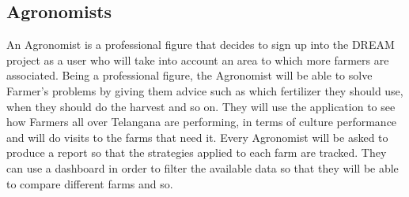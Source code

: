 \documentclass[10pt]{report}
\begin{document}
\subsection{Agronomists}
An Agronomist is a professional figure that decides to sign up into the DREAM project as a user who will take into account an area to which more farmers are associated.
Being a professional figure, the Agronomist will be able to solve Farmer’s problems by giving them advice such as which fertilizer they should use, when they should do the harvest and so on. 
They will use the application to see how Farmers all over Telangana are performing, in terms of culture performance and will do visits to the farms that need it. Every Agronomist will be asked to produce a report so that the strategies applied to each farm are tracked. 
They can use a dashboard in order to filter the available data so that they will be able to compare different farms and so. 
\end{document}

